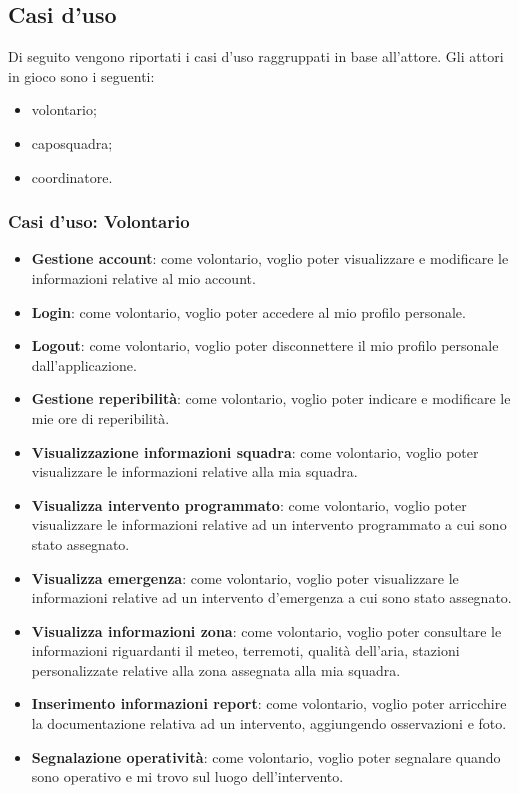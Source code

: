 \subsection{Casi d'uso}
Di seguito vengono riportati i casi d'uso raggruppati in base all'attore. Gli attori in gioco sono i seguenti:
\begin{itemize}
	\item volontario;
	\item caposquadra;
	\item coordinatore.
\end{itemize}

\subsubsection{Casi d'uso: Volontario}
\begin{itemize}
	\item \textbf{Gestione account}:
	come volontario, voglio poter visualizzare e modificare le informazioni relative al mio account.
	
	\item \textbf{Login}:
	come volontario, voglio poter accedere al mio profilo personale.
	
	\item \textbf{Logout}:
	come volontario, voglio poter disconnettere il mio profilo personale dall'applicazione.
	
	\item \textbf{Gestione reperibilità}:
	come volontario, voglio poter indicare e modificare le mie ore di reperibilità.
	
	\item \textbf{Visualizzazione informazioni squadra}:
	come volontario, voglio poter visualizzare le informazioni relative alla mia squadra.
	
	\item \textbf{Visualizza intervento programmato}:
	come volontario, voglio poter visualizzare le informazioni relative ad un intervento programmato a cui sono stato assegnato.
	
	\item \textbf{Visualizza emergenza}:
	come volontario, voglio poter visualizzare le informazioni relative ad un intervento d'emergenza a cui sono stato assegnato.
	
	\item \textbf{Visualizza informazioni zona}:
	come volontario, voglio poter consultare le informazioni riguardanti il meteo, terremoti, qualità dell'aria, stazioni personalizzate relative alla zona assegnata alla mia squadra.
	
	\item \textbf{Inserimento informazioni report}:
	come volontario, voglio poter arricchire la documentazione relativa ad un intervento, aggiungendo osservazioni e foto.
	
	\item \textbf{Segnalazione operatività}:
	come volontario, voglio poter segnalare quando sono operativo e mi trovo sul luogo dell'intervento.
\end{itemize}





